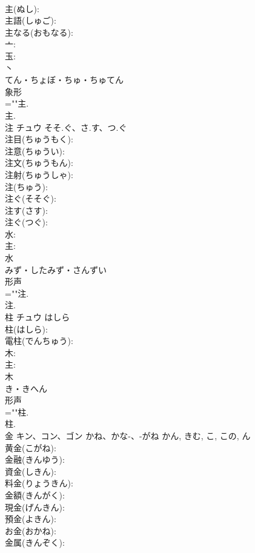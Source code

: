 \documentclass[8pt]{extreport}
\begin{document}
\begin{CJK}{UTF8}{min}
\\	主(ぬし): 
\\	主語(しゅご): 
\\	主なる(おもなる): 
\\	亠: 
\\	玉: 
\\	丶	
\\	てん・ちょぼ・ちゅ・ちゅてん	
\\	象形 
\\	=""主.
\\	主.
\\	注	チュウ	そそ.ぐ、さ.す、つ.ぐ		
\\	注目(ちゅうもく): 
\\	注意(ちゅうい): 
\\	注文(ちゅうもん): 
\\	注射(ちゅうしゃ): 
\\	注(ちゅう): 
\\	注ぐ(そそぐ): 
\\	注す(さす): 
\\	注ぐ(つぐ): 
\\	水: 
\\	主: 
\\	水	
\\	みず・したみず・さんずい	
\\	形声 
\\	=""注.
\\	注.
\\	柱	チュウ	はしら		
\\	柱(はしら): 
\\	電柱(でんちゅう): 
\\	木: 
\\	主: 
\\	木	
\\	き・きへん	
\\	形声 
\\	=""柱.
\\	柱.
\\	金	キン、コン、ゴン	かね、かな-、-がね	かん, きむ, こ, この, ん	
\\	黄金(こがね): 
\\	金融(きんゆう): 
\\	資金(しきん): 
\\	料金(りょうきん): 
\\	金額(きんがく): 
\\	現金(げんきん): 
\\	預金(よきん): 
\\	お金(おかね): 
\\	金属(きんぞく): 

\end{CJK}
\end{document}
